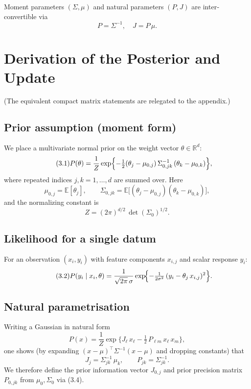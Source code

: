 \documentclass[11pt]{article}
\begin{document}
Moment parameters $(\Sigma,\mu)$ and natural parameters $(P,J)$ are inter‐convertible via
\[
  P = \Sigma^{-1}, 
  \quad
  J = P\,\mu.
\]

\section{Derivation of the Posterior and Update}

(The equivalent compact matrix statements are relegated to the appendix.)

\subsection{Prior assumption (moment form)}

We place a multivariate normal prior on the weight vector $\theta\in\mathbb{R}^d$:
\begin{equation}\tag{3.1}
P(\theta)
= \frac{1}{Z}
\exp\Bigl\{
-\tfrac{1}{2}
(\theta_j - \mu_{0,j})
\,\Sigma_{0,jk}^{-1}\,
(\theta_k - \mu_{0,k})
\Bigr\},
\end{equation}
where repeated indices $j,k=1,\dots,d$ are summed over.  Here
\[
\mu_{0,j} = \mathbb{E}[\theta_j], 
\qquad
\Sigma_{0,jk} = \mathbb{E}\bigl[(\theta_j - \mu_{0,j})(\theta_k - \mu_{0,k})\bigr],
\]
and the normalizing constant is
\[
Z = (2\pi)^{d/2}\,\det(\Sigma_0)^{1/2}.
\]

\subsection{Likelihood for a single datum}

For an observation $(x_i,y_i)$ with feature components $x_{i,j}$ and scalar response $y_i$:
\begin{equation}\tag{3.2}
P(y_i \mid x_i,\theta)
= \frac{1}{\sqrt{2\pi}\,\sigma}
\exp\!\Bigl\{
-\tfrac{1}{2\sigma^2}\,(y_i - \theta_j\,x_{i,j})^2
\Bigr\}.
\end{equation}

\subsection{Natural parametrisation}

Writing a Gaussian in natural form
\begin{equation}\tag{3.3}
P(x)
= \frac{1}{Z}
\exp\!\bigl\{J_\ell\,x_\ell 
- \tfrac12\,P_{\ell m}\,x_\ell\,x_m\bigr\},
\end{equation}
one shows (by expanding $(x-\mu)^\top\Sigma^{-1}(x-\mu)$ and dropping constants) that
\begin{equation}\tag{3.4}
J_j = \Sigma^{-1}_{jk}\,\mu_k,
\qquad
P_{jk} = \Sigma^{-1}_{jk}.
\end{equation}
We therefore define the prior information vector $J_{0,j}$ and prior precision matrix $P_{0,jk}$ from $\mu_0,\Sigma_0$ via (3.4).
\end{document}
